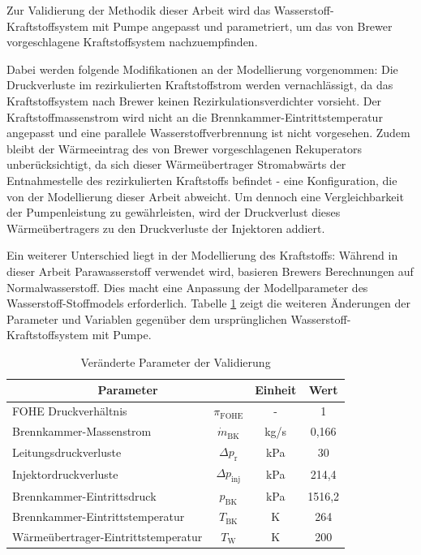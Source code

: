 Zur Validierung der Methodik dieser Arbeit wird das Wasserstoff-Kraftstoffsystem mit Pumpe angepasst und parametriert, um das von Brewer \cite{Brewer.1991} vorgeschlagene Kraftstoffsystem nachzuempfinden. 

Dabei werden folgende Modifikationen an der Modellierung vorgenommen: Die Druckverluste im rezirkulierten Kraftstoffstrom werden vernachlässigt, da das Kraftstoffsystem nach Brewer keinen Rezirkulationsverdichter vorsieht. Der Kraftstoffmassenstrom wird nicht an die Brennkammer-Eintrittstemperatur angepasst und eine parallele Wasserstoffverbrennung ist nicht vorgesehen. Zudem bleibt der Wärmeeintrag des von Brewer vorgeschlagenen Rekuperators unberücksichtigt, da sich dieser Wärmeübertrager Stromabwärts der Entnahmestelle des rezirkulierten Kraftstoffs befindet - eine Konfiguration, die von der Modellierung dieser Arbeit abweicht. Um dennoch eine Vergleichbarkeit der Pumpenleistung zu gewährleisten, wird der Druckverlust dieses Wärmeübertragers zu den Druckverluste der Injektoren addiert. 

Ein weiterer Unterschied liegt in der Modellierung des Kraftstoffs: Während in dieser Arbeit Parawasserstoff verwendet wird, basieren Brewers Berechnungen auf Normalwasserstoff. Dies macht eine Anpassung der Modellparameter des Wasserstoff-Stoffmodels erforderlich. Tabelle \ref{Tab:brewer} zeigt die weiteren Änderungen der Parameter und Variablen gegenüber dem ursprünglichen Wasserstoff-Kraftstoffsystem mit Pumpe.

\begin{table}[ht]
    \centering
	\caption{Veränderte Parameter der Validierung}
	\begin{tabular} {|l|c|c|c|} \hline%
    \multicolumn{2}{|c|}{Parameter} & Einheit & Wert\\ \hline\hline%
    FOHE Druckverhältnis & $\pi_\mathrm{FOHE}$ & - & 1 \\ \hline
    Brennkammer-Massenstrom & $\dot{m}_\mathrm{BK}$ & kg/s & 0,166 \\ \hline
    Leitungsdruckverluste & $\Delta p_\mathrm{r}$ & kPa & 30 \\ \hline
    Injektordruckverluste & $\Delta p_\mathrm{inj}$ & kPa & 214,4 \\ \hline
    Brennkammer-Eintrittsdruck & $p_\mathrm{BK}$ & kPa & 1516,2 \\ \hline
    Brennkammer-Eintrittstemperatur & $T_\mathrm{BK}$ & K & 264 \\ \hline
    Wärmeübertrager-Eintrittstemperatur & $T_\mathrm{W}$ & K & 200 \\ \hline
    \end{tabular}	
    \label{Tab:brewer}%
\end{table}
\FloatBarrier 


